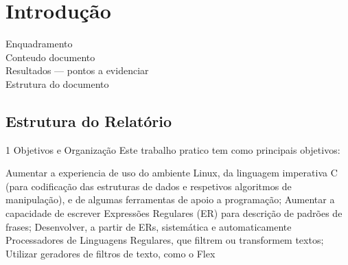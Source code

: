\chapter*{Introdução}\label{intro}

\begin{description}
  \item [Enquadramento] 
  \item [Conteudo documento]
  \item [Resultados --- pontos a evidenciar]
  \item [Estrutura do documento]
\end{description}


\section*{Estrutura do Relatório} 


%
%

1     Objetivos e Organização
Este trabalho pratico tem como principais objetivos:

		Aumentar a experiencia de uso do ambiente Linux, da linguagem imperativa
		C (para codificação das estruturas de dados e respetivos algoritmos de
		manipulação), e de algumas ferramentas de apoio a programação;
		Aumentar a capacidade de escrever Expressões Regulares (ER) para descrição
		de padrões de frases;
		Desenvolver, a partir de ERs, sistemática e automaticamente Processadores
		de Linguagens Regulares, que filtrem ou transformem textos;
    Utilizar geradores de filtros de texto, como o Flex


